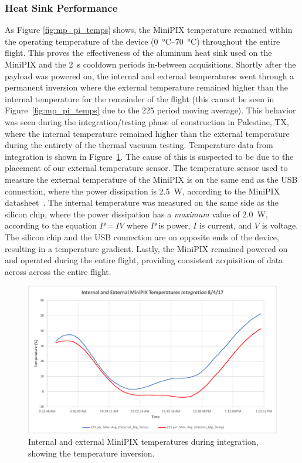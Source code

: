 \subsubsection{Heat Sink Performance}
As Figure \ref{fig:mp_pi_temps} shows, the MiniPIX temperature remained within the operating temperature of the device (\SIrange{0}{70}{\celsius}) throughout the entire flight. This proves the effectiveness of the aluminum heat sink used on the MiniPIX and the \SI{2}{\second} cooldown periods in-between acquisitions. Shortly after the payload was powered on, the internal and external temperatures went through a permanent inversion where the external temperature remained higher than the internal temperature for the remainder of the flight (this cannot be seen in Figure~\ref{fig:mp_pi_temps} due to the \num{225} period moving average). This behavior was seen during the integration/testing phase of construction in Palestine, TX, where the internal temperature remained higher than the external temperature during the entirety of the thermal vacuum testing. Temperature data from integration is shown in Figure~\ref{fig:minipix_integration}. The cause of this is suspected to be due to the placement of our external temperature sensor. The temperature sensor used to measure the external temperature of the MiniPIX is on the same end as the USB connection, where the power dissipation is \SI{2.5}{\watt}, according to the MiniPIX datasheet~\cite{mpdatasheet}. The internal temperature was measured on the same side as the silicon chip, where the power dissipation has a \textit{maximum} value of \SI{2.0}{\watt}, according to the equation $P = IV$ where $P$ is power, $I$ is current, and $V$ is voltage. The silicon chip and the USB connection are on opposite ends of the device, resulting in a temperature gradient. Lastly, the MiniPIX remained powered on and operated during the entire flight, providing consistent acquisition of data across across the entire flight. 

\begin{figure}
  \begin{center}
    \includegraphics[width=.8\textwidth]{./Figures/integration_temps.pdf}
    \caption{Internal and external MiniPIX temperatures during integration, showing the temperature inversion.}
    \label{fig:minipix_integration}
  \end{center}
\end{figure}



